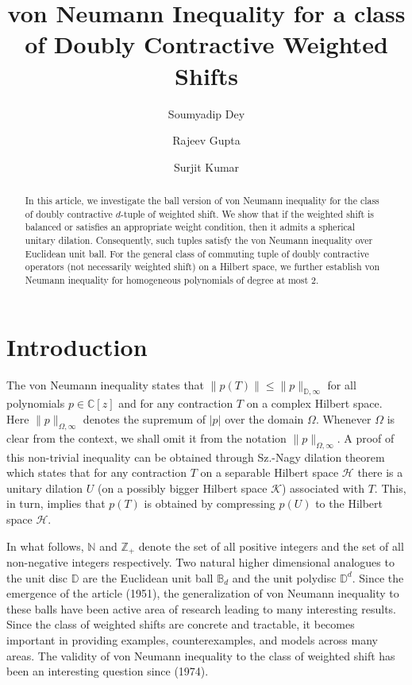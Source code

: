 \documentclass[12pt,reqno] {amsart}
\title[von Neumann Inequality and Doubly Contractive Weighted Shift]{von Neumann Inequality for a class of Doubly Contractive Weighted Shifts}
\author[S. Dey]{Soumyadip Dey}
\author[R. Gupta]{Rajeev Gupta}
\author[S. Kumar]{Surjit Kumar}
\theoremstyle{remark}
\theoremstyle{definition}
\begin{document}
\begin{abstract}
In this article, we investigate the ball version of von Neumann inequality for the class of doubly contractive $d$-tuple of weighted shift. We show that if the weighted shift is balanced or satisfies an appropriate weight condition, then it admits a spherical unitary dilation. Consequently, such tuples satisfy the von Neumann inequality over Euclidean unit ball. For the general class of commuting tuple of doubly contractive operators (not necessarily weighted shift) on a Hilbert space, we further establish von Neumann inequality for homogeneous polynomials of degree at most $2.$ 
\end{abstract}

\maketitle

\section{Introduction}
The von Neumann inequality \cite{vN} states that $\|p(T)\|\leqslant \|p\|_{\mathbb D,\infty}$
for all polynomials $p\in\mathbb{C}[z]$ and for any contraction $T$ on a complex Hilbert space. 
Here $\|p\|_{\Omega,\infty}$ denotes the supremum of $|p|$ over the domain $\Omega.$ Whenever $\Omega$ is clear from the context, we shall omit it from the notation $\|p\|_{\Omega, \infty}.$
A proof of this non-trivial inequality can be obtained through Sz.-Nagy dilation theorem \cite{Sz-dilation} which states that for any contraction $T$ on a separable Hilbert space $\mathcal H$ there is a unitary dilation $U$ (on a possibly bigger Hilbert space $\mathcal K$) associated with $T$. This, in turn, implies that $p(T)$ is obtained by compressing $p(U)$ to the Hilbert space $\mathcal H.$
 

In what follows, $\mathbb N$ and $\mathbb Z_+$ denote the set of all positive integers and the set of all non-negative integers respectively. Two natural higher dimensional analogues to the unit disc $\mathbb D$ are the Euclidean unit ball $\mathbb B_d$ and the unit polydisc $\mathbb D^d.$  Since the emergence of the article (1951)\cite{vN}, the generalization of von Neumann inequality to these balls have been active area of research leading to many interesting results. Since the class of weighted shifts are concrete and tractable, it becomes important in providing examples, counterexamples, and models across many areas. The validity of von Neumann inequality to the class of weighted shift has been an interesting question since (1974)\cite{Shields}. 
\end{document}
